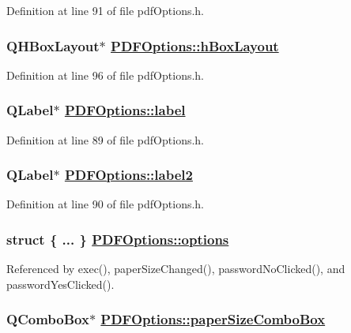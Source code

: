 Definition at line 91 of file pdf\-Options.h.\hypertarget{classPDFOptions_r53}{
\subsubsection[hBoxLayout]{\setlength{\rightskip}{0pt plus 5cm}QHBox\-Layout$\ast$ \hyperlink{classPDFOptions_r53}{PDFOptions::h\-Box\-Layout}}}
\label{classPDFOptions_r53}


Definition at line 96 of file pdf\-Options.h.\hypertarget{classPDFOptions_r46}{
\subsubsection[label]{\setlength{\rightskip}{0pt plus 5cm}QLabel$\ast$ \hyperlink{classPDFOptions_r46}{PDFOptions::label}}}
\label{classPDFOptions_r46}


Definition at line 89 of file pdf\-Options.h.\hypertarget{classPDFOptions_r47}{
\subsubsection[label2]{\setlength{\rightskip}{0pt plus 5cm}QLabel$\ast$ \hyperlink{classPDFOptions_r47}{PDFOptions::label2}}}
\label{classPDFOptions_r47}


Definition at line 90 of file pdf\-Options.h.\hypertarget{classPDFOptions_r43}{
\subsubsection[options]{\setlength{\rightskip}{0pt plus 5cm}struct \{ ... \}   \hyperlink{classPDFOptions_r43}{PDFOptions::options}}}
\label{classPDFOptions_r43}




Referenced by exec(), paper\-Size\-Changed(), password\-No\-Clicked(), and password\-Yes\-Clicked().\hypertarget{classPDFOptions_r20}{
\subsubsection[paperSizeComboBox]{\setlength{\rightskip}{0pt plus 5cm}QCombo\-Box$\ast$ \hyperlink{classPDFOptions_r20}{PDFOptions::paper\-Size\-Combo\-Box}}}
\label{classPDFOptions_r20}



